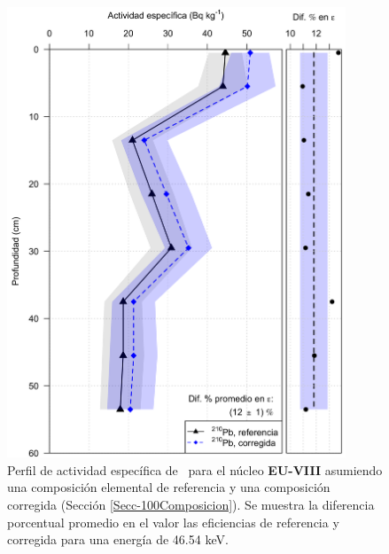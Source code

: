 \begin{figure}
\centering
\includegraphics[width=0.9\textwidth]{Imagenes/Act_210Pb_Agua_Composicion_EU_VIII.png}
\caption{Perfil de actividad específica de \PbCero\, para el núcleo \textbf{EU-VIII} asumiendo una composición elemental de referencia y una composición corregida (Sección \ref{Secc-100Composicion}). Se muestra la diferencia porcentual promedio en el valor las eficiencias de referencia y corregida para una energía de 46.54 keV.}\label{FigEUVIIIAgua}
\end{figure}
